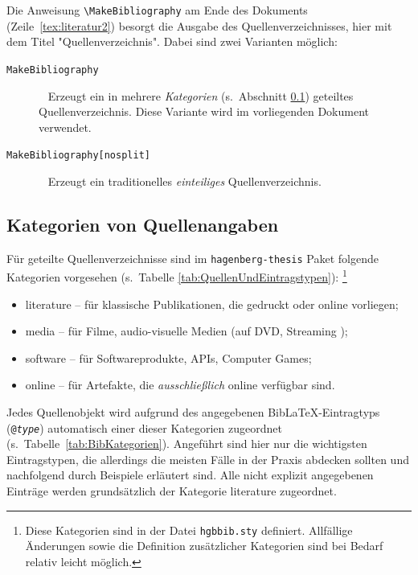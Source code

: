 Die Anweisung \verb!\MakeBibliography! am Ende des Dokuments
(Zeile~\ref{tex:literatur2}) besorgt die Ausgabe des Quellenverzeichnisses,
hier mit dem Titel "Quellenverzeichnis". Dabei sind zwei Varianten möglich:
%
\begin{description}
    \item[\texttt{{\bs}MakeBibliography}] ~ \newline
    Erzeugt ein in mehrere \emph{Kategorien} (s.\ Abschnitt
    \ref{sec:BibKategorien}) geteiltes Quellenverzeichnis. Diese
    Variante wird im vorliegenden Dokument verwendet.
%
    \item[\texttt{{\bs}MakeBibliography[nosplit]}] ~ \newline
    Erzeugt ein traditionelles \emph{einteiliges} Quellenverzeichnis.
\end{description}


\subsection{Kategorien von Quellenangaben}
\label{sec:BibKategorien}

Für geteilte Quellenverzeichnisse sind im \texttt{hagenberg-thesis} Paket folgende
Kategorien vorgesehen (s.\ Tabelle \ref{tab:QuellenUndEintragstypen}):%
\footnote{Diese Kategorien sind in der Datei \nolinkurl{hgbbib.sty} definiert.
Allfällige Änderungen sowie die Definition zusätzlicher Kategorien sind bei
Bedarf relativ leicht möglich.}
%
\begin{itemize}
    \item[] \textsf{literature} -- für klassische Publikationen, die gedruckt
    oder online vorliegen;
    \item[] \textsf{media} -- für Filme, audio-visuelle Medien (auf DVD,
    Streaming \usw);
    \item[] \textsf{software} -- für Softwareprodukte, APIs, Computer Games;
    \item[] \textsf{online} -- für Artefakte, die \emph{ausschließlich}
    online verfügbar sind.
\end{itemize}
%
Jedes Quellenobjekt wird aufgrund des angegebenen BibLaTeX-Eintragtyps
(\texttt{@\emph{type}}) automatisch einer dieser Kategorien zugeordnet (s.\
Tabelle~\ref{tab:BibKategorien}). Angeführt sind hier nur die wichtigsten
Eintragstypen, die allerdings die meisten Fälle in der Praxis abdecken
sollten und nachfolgend durch Beispiele erläutert sind. Alle nicht explizit
angegebenen Einträge werden grundsätzlich der Kategorie \textsf{literature}
zugeordnet.

